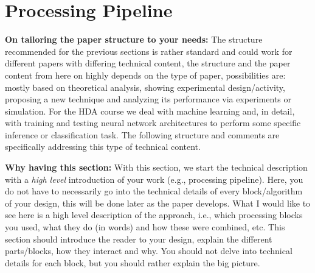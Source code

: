
\section{Processing Pipeline}
\label{sec:processing_architecture}

\begin{remark}
\textbf{On tailoring the paper structure to your needs:} The structure recommended for the previous sections is rather standard and could work for different papers with differing technical content, the structure and the paper content from here on highly depends on the type of paper, possibilities are: mostly based on theoretical analysis, showing experimental design/activity, proposing a new technique and analyzing its performance via experiments or simulation. For the HDA course we deal with machine learning and, in detail, with training and testing neural network architectures to perform some specific inference or classification task. The following structure and comments are specifically addressing this type of technical content.
\end{remark}

\begin{remark}
\textbf{Why having this section:} With this section, we start the technical description with a {\it high level} introduction of your work (e.g., processing pipeline). Here, you do not have to necessarily go into the technical details of every block/algorithm of your design, this will be done later as the paper develops. What I would like to see here is a high level description of the approach, i.e., which processing blocks you used, what they do (in words) and how these were combined, etc. This section should introduce the reader to your design, explain the different parts/blocks, how they interact and why. You should not delve into technical details for each block, but you should rather explain the big picture. 
\end{remark} 

